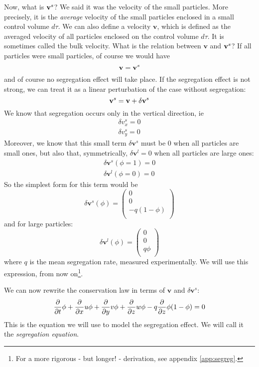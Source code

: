 Now, what is $\mathbf{v}^s$? We said it was the velocity of the small particles. More precisely, it is the \textit{average} velocity of the small particles enclosed in a small control volume $d\tau$. We can also define a velocity $\mathbf{v}$, which is defined as the averaged velocity of all particles enclosed on the control volume $d\tau$.
It is sometimes called the bulk velocity.
What is the relation between $\mathbf{v}$ and $\mathbf{v}^s$? If all particles were small particles, of course we would have
\begin{equation}
	\mathbf{v} = \mathbf{v}^s
\end{equation}
and of course no segregation effect will take place.
If the segregation effect is not strong, we can treat it as a linear perturbation of the case without segregation:
\begin{equation}
	\mathbf{v}^s = \mathbf{v} + \delta \textbf{v}^s
\end{equation}
We know that segregation occurs only in the vertical direction, ie
\begin{align}
	\delta v^s_x = 0 \\
	\delta v^s_y = 0 
\end{align}
Moreover, we know that this small term $\delta \textbf{v}^s$ must be $0$ when all particles are small ones, but also that, symmetrically,  $\delta \textbf{v}^l = 0$ when all particles are large ones:
\begin{align}
	\delta \textbf{v}^s(\phi = 1) = 0 \\
	\delta \textbf{v}^l(\phi = 0) = 0
\end{align}
So the simplest form for this term would be
\begin{equation}
	\delta \textbf{v}^s(\phi) = 
	\begin{pmatrix}
	0 \\
	0 \\
- q ( 1 - \phi ) \\
\end{pmatrix}
\end{equation}
and for large particles:
\begin{equation}
	\delta \textbf{v}^l(\phi) = 
	\begin{pmatrix}
	0 \\
	0 \\
 q \phi \\
\end{pmatrix}
\end{equation}
where $q$ is the mean segregation rate, measured experimentally.
We will use this expression, from now on\footnote{For a more rigorous - but longer! - derivation, see appendix \ref{app:segreg}.}.

We can now rewrite the conservation law in terms of $\mathbf{v}$ and $\delta \mathbf{v}^s$:
\begin{equation}
	\frac{\partial {}}{\partial {t}} \phi + \frac{\partial {}}{\partial {x}} u \phi + \frac{\partial {}}{\partial {y}} v \phi + \frac{\partial {}}{\partial {z}} w \phi - q \frac{\partial {}}{\partial {z}} \phi( 1 - \phi) = 0
\end{equation}
This is the equation we will use to model the segregation effect. We will call it the \emph{segregation equation}.
 
